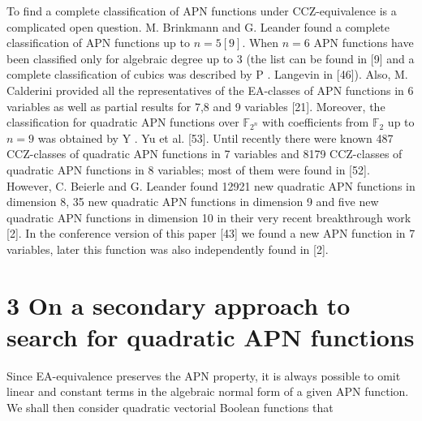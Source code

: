 \documentclass[10pt]{article}
\begin{document}
To find a complete classification of APN functions under CCZ-equivalence is a complicated open question. M. Brinkmann and G. Leander found a complete classification of APN functions up to $n=5[9]$. When $n=6$ APN functions have been classified only for algebraic degree up to 3 (the list can be found in [9] and a complete classification of cubics was described by P . Langevin in [46]). Also, M. Calderini provided all the representatives of the EA-classes of APN functions in 6 variables as well as partial results for 7,8 and 9 variables [21]. Moreover, the classification for quadratic APN functions over $\mathbb{F}_{2^{n}}$ with coefficients from $\mathbb{F}_{2}$ up to $n=9$ was obtained by Y . Yu et al. [53]. Until recently there were known 487 CCZ-classes of quadratic APN functions in 7 variables and 8179 CCZ-classes of quadratic APN functions in 8 variables; most of them were found in [52]. However, C. Beierle and G. Leander found 12921 new quadratic APN functions in dimension 8, 35 new quadratic APN functions in dimension 9 and five new quadratic APN functions in dimension 10 in their very recent breakthrough work [2]. In the conference version of this paper [43] we found a new APN function in 7 variables, later this function was also independently found in [2].

\section*{3 On a secondary approach to search for quadratic APN functions}
Since EA-equivalence preserves the APN property, it is always possible to omit linear and constant terms in the algebraic normal form of a given APN function. We shall then consider quadratic vectorial Boolean functions that
\end{document}
